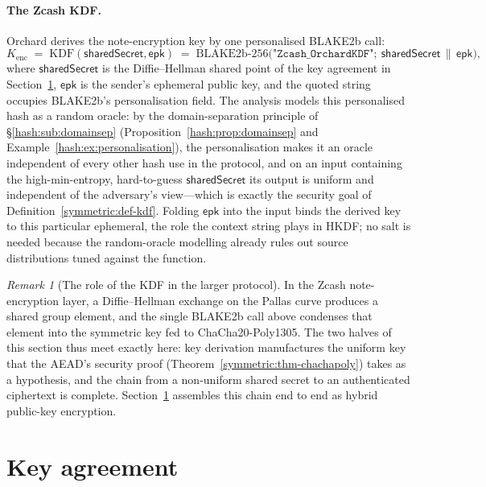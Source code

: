 \documentclass[11pt,a4paper]{article}
\theoremstyle{definition}
\theoremstyle{remark}
\newtheorem{remark}[theorem]{Remark}
\begin{document}
\paragraph{The Zcash KDF.} Orchard derives the note-encryption key by one personalised BLAKE2b call:
\[
  K_{\mathrm{enc}} \;=\; \mathrm{KDF}(\mathsf{sharedSecret}, \mathsf{epk})
  \;=\; \mathrm{BLAKE2b}\text{-}256\bigl(\texttt{"Zcash\_OrchardKDF"};\ \mathsf{sharedSecret} \,\|\, \mathsf{epk}\bigr),
\]
where \(\mathsf{sharedSecret}\) is the Diffie--Hellman shared point of the key agreement in Section~\ref{sec:keyagreement}, \(\mathsf{epk}\) is the sender's ephemeral public key, and the quoted string occupies BLAKE2b's personalisation field. The analysis models this personalised hash as a random oracle: by the domain-separation principle of \S\ref{hash:sub:domainsep} (Proposition~\ref{hash:prop:domainsep} and Example~\ref{hash:ex:personalisation}), the personalisation makes it an oracle independent of every other hash use in the protocol, and on an input containing the high-min-entropy, hard-to-guess \(\mathsf{sharedSecret}\) its output is uniform and independent of the adversary's view---which is exactly the security goal of Definition~\ref{symmetric:def-kdf}. Folding \(\mathsf{epk}\) into the input binds the derived key to this particular ephemeral, the role the context string plays in HKDF; no salt is needed because the random-oracle modelling already rules out source distributions tuned against the function.

\begin{remark}[The role of the KDF in the larger protocol]\label{symmetric:rem-hkdf-role}
In the Zcash note-encryption layer, a Diffie--Hellman exchange on the Pallas curve produces a shared group element, and the single BLAKE2b call above condenses that element into the symmetric key fed to \textsf{ChaCha20-Poly1305}. The two halves of this section thus meet exactly here: key derivation manufactures the uniform key that the AEAD's security proof (Theorem~\ref{symmetric:thm-chachapoly}) takes as a hypothesis, and the chain from a non-uniform shared secret to an authenticated ciphertext is complete. Section~\ref{sec:keyagreement} assembles this chain end to end as hybrid public-key encryption.
\end{remark}

\clearpage
\section{Key agreement}\label{sec:keyagreement}
\end{document}
